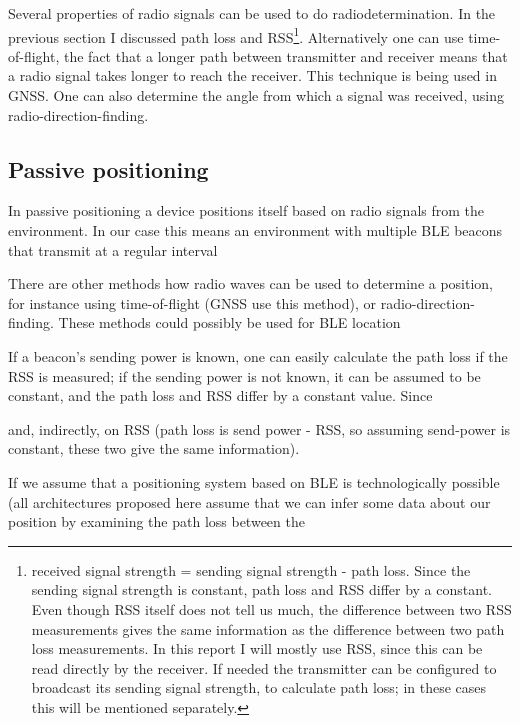 Several properties of radio signals can be used to do radiodetermination.
In the previous section I discussed path loss and RSS\footnote{
    received signal strength = sending signal strength - path loss.
    Since the sending signal strength is constant, path loss and RSS differ by a constant.
    Even though RSS itself does not tell us much, the difference between two RSS measurements gives the same information as the difference between two path loss measurements.
    In this report I will mostly use RSS, since this can be read directly by the receiver.
    If needed the transmitter can be configured to broadcast its sending signal strength, to calculate path loss; in these cases this will be mentioned separately.
}.
Alternatively one can use time-of-flight, the fact that a longer path between transmitter and receiver means that a radio signal takes longer to reach the receiver.
This technique is being used in GNSS.
One can also determine the angle from which a signal was received, using radio-direction-finding.

\subsection{Passive positioning}
In passive positioning a device positions itself based on radio signals from the environment.
In our case this means an environment with multiple BLE beacons that transmit at a regular interval



There are other methods how radio waves can be used to determine a position, for instance using time-of-flight (GNSS use this method), or radio-direction-finding.
These methods could possibly be used for BLE location 


If a beacon's sending power is known, one can easily calculate the path loss if the RSS is measured; if the sending power is not known, it can be assumed to be constant, and the path loss and RSS differ by a constant value.
Since 

 and, indirectly, on RSS (path loss is send power - RSS, so assuming send-power is constant, these two give the same information).

If we assume that a positioning system based on BLE is technologically possible (all architectures proposed here assume that we can infer some data about our position by examining the path loss between the 
